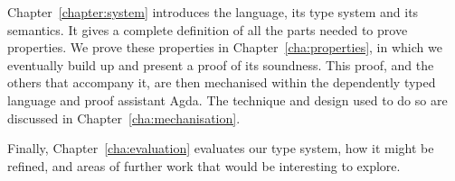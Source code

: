 \documentclass{report}
\begin{document}
Chapter~\ref{chapter:system} introduces the language, its type system and its
semantics.  It gives a complete definition of all the parts needed to prove
properties.  We prove these properties in Chapter~\ref{cha:properties}, in
which we eventually build up and present a proof of its soundness. This proof,
and the others that accompany it, are then mechanised within the dependently
typed language and proof assistant Agda. The technique and design used to do so
are discussed in Chapter~\ref{cha:mechanisation}.

Finally, Chapter~\ref{cha:evaluation} evaluates our type system, how it might be
refined, and areas of further work that would be interesting to explore.















\end{document}
